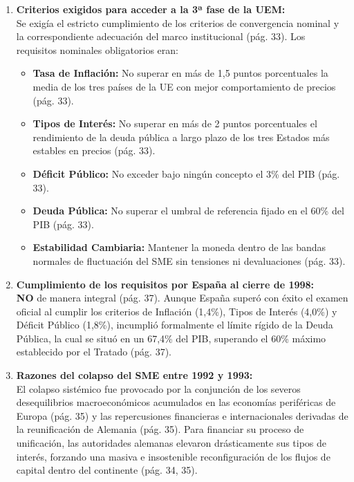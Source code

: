 \begin{enumerate}[label=\arabic*.]
    \item \textbf{Criterios exigidos para acceder a la 3ª fase de la UEM:} \\
    Se exigía el estricto cumplimiento de los criterios de convergencia nominal y la correspondiente adecuación del marco institucional (pág. 33). Los requisitos nominales obligatorios eran:
    \begin{itemize}
        \item \textbf{Tasa de Inflación:} No superar en más de 1,5 puntos porcentuales la media de los tres países de la UE con mejor comportamiento de precios (pág. 33).
        \item \textbf{Tipos de Interés:} No superar en más de 2 puntos porcentuales el rendimiento de la deuda pública a largo plazo de los tres Estados más estables en precios (pág. 33).
        \item \textbf{Déficit Público:} No exceder bajo ningún concepto el 3\% del PIB (pág. 33).
        \item \textbf{Deuda Pública:} No superar el umbral de referencia fijado en el 60\% del PIB (pág. 33).
        \item \textbf{Estabilidad Cambiaria:} Mantener la moneda dentro de las bandas normales de fluctuación del SME sin tensiones ni devaluaciones (pág. 33).
    \end{itemize}

    \item \textbf{Cumplimiento de los requisitos por España al cierre de 1998:} \\
    \textbf{NO} de manera integral (pág. 37). Aunque España superó con éxito el examen oficial al cumplir los criterios de Inflación (1,4\%), Tipos de Interés (4,0\%) y Déficit Público (1,8\%), incumplió formalmente el límite rígido de la Deuda Pública, la cual se situó en un 67,4\% del PIB, superando el 60\% máximo establecido por el Tratado (pág. 37).

    \item \textbf{Razones del colapso del SME entre 1992 y 1993:} \\
    El colapso sistémico fue provocado por la conjunción de los severos desequilibrios macroeconómicos acumulados en las economías periféricas de Europa (pág. 35)  y las repercusiones financieras e internacionales derivadas de la reunificación de Alemania (pág. 35). Para financiar su proceso de unificación, las autoridades alemanas elevaron drásticamente sus tipos de interés, forzando una masiva e insostenible reconfiguración de los flujos de capital dentro del continente (pág. 34, 35).


\end{enumerate}
